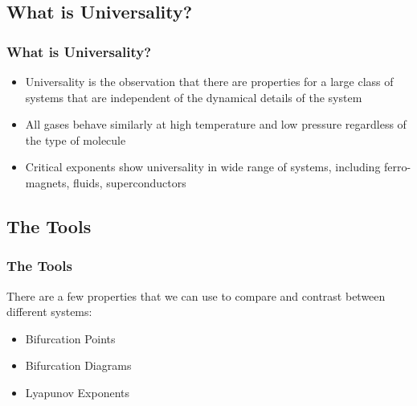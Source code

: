 \documentclass[
	11pt, %
	aspectratio=169, %
]{beamer}
\begin{document}

\subsection{What is Universality?}

\begin{frame}
	\frametitle{What is Universality?}
	
	\begin{itemize}
        \item Universality is the observation that there are properties for a large class of systems that are independent of the dynamical details of the system \pause
        \item All gases behave similarly at high temperature and low pressure regardless of the type of molecule \pause
        \item Critical exponents show universality in wide range of systems, including ferro-magnets, fluids, superconductors
    \end{itemize}

\end{frame}


\subsection{The Tools}

\begin{frame}
	\frametitle{The Tools}
	There are a few properties that we can use to compare and contrast between different systems: \pause
    \begin{itemize}
        \item Bifurcation Points \pause
        \item Bifurcation Diagrams \pause
        \item Lyapunov Exponents
    \end{itemize}

\end{frame}

\end{document}
